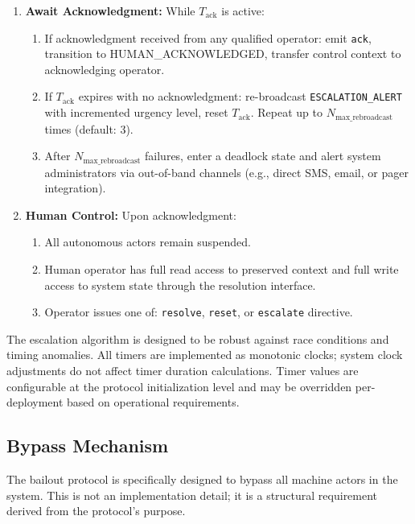 \begin{algorithm}
\begin{enumerate}
    \item \textbf{Await Acknowledgment:} While $T_{\text{ack}}$ is active:
    \begin{enumerate}
        \item If acknowledgment received from any qualified operator: emit \texttt{ack}, transition to HUMAN\_ACKNOWLEDGED, transfer control context to acknowledging operator.
        \item If $T_{\text{ack}}$ expires with no acknowledgment: re-broadcast \texttt{ESCALATION\_ALERT} with incremented urgency level, reset $T_{\text{ack}}$. Repeat up to $N_{\text{max\_rebroadcast}}$ times (default: 3).
        \item After $N_{\text{max\_rebroadcast}}$ failures, enter a deadlock state and alert system administrators via out-of-band channels (e.g., direct SMS, email, or pager integration).
    \end{enumerate}
    
    \item \textbf{Human Control:} Upon acknowledgment:
    \begin{enumerate}
        \item All autonomous actors remain suspended.
        \item Human operator has full read access to preserved context and full write access to system state through the resolution interface.
        \item Operator issues one of: \texttt{resolve}, \texttt{reset}, or \texttt{escalate} directive.
    \end{enumerate}
\end{enumerate}
\end{algorithm}

The escalation algorithm is designed to be robust against race conditions and timing anomalies. All timers are implemented as monotonic clocks; system clock adjustments do not affect timer duration calculations. Timer values are configurable at the protocol initialization level and may be overridden per-deployment based on operational requirements.

\subsection{Bypass Mechanism}

The bailout protocol is specifically designed to bypass all machine actors in the system. This is not an implementation detail; it is a structural requirement derived from the protocol's purpose.

